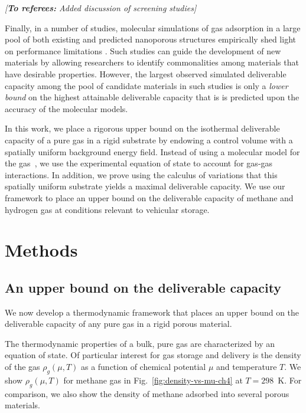 \documentclass[twoside,twocolumn,9pt]{article}
\newcommand\startreferees[1]{\cbstart \noindent\textit{\color{red}%
[\textbf{To referees:} #1]}

}
\newcommand\donereferees{\cbend}
\begin{document}
\startreferees{Added discussion of screening studies}
Finally, in a number of studies, molecular simulations of gas adsorption in
a large pool of both existing and predicted nanoporous
structures empirically shed light on performance limitations \cite{firlej2013understanding, goldsmith2013theoretical,
ahmed2019exceptional,simon2015materials}.
Such studies can guide the development of new materials
by allowing researchers to identify commonalities among materials that have
desirable properties.  
However, the largest observed simulated deliverable capacity among the pool of candidate materials in such studies
is only a \emph{lower bound} on the highest attainable deliverable capacity that is is predicted upon the accuracy of the molecular models.
\donereferees


In this work, we place a rigorous upper bound on the isothermal deliverable capacity of a
pure gas in a rigid substrate by endowing a control volume with a spatially
uniform background energy field. Instead of using a molecular model for the
gas~\cite{gomez2017impact}, we use the experimental equation of state to
account for gas-gas interactions. In addition, we prove using the calculus of
variations that this spatially uniform substrate yields a maximal deliverable
capacity. We use our framework to place an upper bound on the deliverable
capacity of methane and hydrogen gas at conditions relevant to vehicular storage.

\section{Methods}
\subsection{An upper bound on the deliverable capacity}\label{sec:upper-bound}
We now develop a thermodynamic framework that places an upper bound on the deliverable capacity of any pure gas in a rigid porous material.

The thermodynamic properties of a bulk, pure gas are characterized by an
equation of state. Of particular interest for gas storage and delivery is the
density of the gas $\rho_g(\mu,T)$ as a function of chemical potential $\mu$
and temperature $T$. We show $\rho_g(\mu, T)$ for methane gas in
Fig.~\ref{fig:density-vs-mu-ch4} at $T=298$\ K. For comparison, we also show
the density of methane adsorbed into several porous materials.
\end{document}
